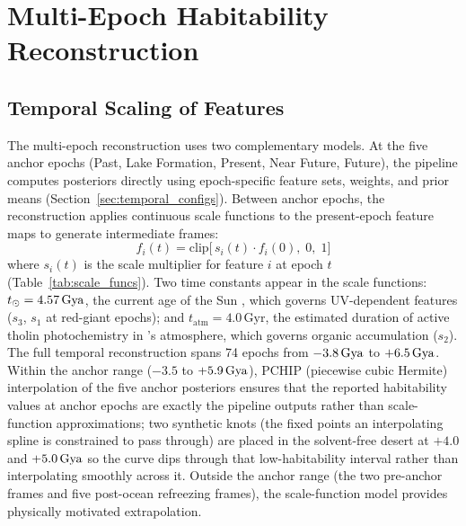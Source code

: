 \section{Multi-Epoch Habitability Reconstruction}
\label{sec:multi_epoch}

\subsection{Temporal Scaling of Features}
\label{sec:epoch_scaling}

The multi-epoch reconstruction uses two complementary models.  At the five anchor epochs (Past, Lake Formation, Present, Near Future, Future), the pipeline computes posteriors directly using epoch-specific feature sets, weights, and prior means (Section~\ref{sec:temporal_configs}).  Between anchor epochs, the reconstruction applies continuous scale functions to the present-epoch feature maps to generate intermediate frames:
\begin{equation}
  f_i(t) = \text{clip}\bigl[\,s_i(t)\cdot f_i(0),\;0,\;1\bigr]
  \label{eq:temporal_scale}
\end{equation}
where $s_i(t)$ is the scale multiplier for feature $i$ at epoch $t$ (Table~\ref{tab:scale_funcs}).  Two time constants appear in the scale functions: $t_\odot = 4.57\,\text{Gya}$, the current age of the Sun \citep{Bahcall2001}, which governs UV-dependent features ($s_3$, $s_1$ at red-giant epochs); and $t_\text{atm} = 4.0\,\text{Gyr}$, the estimated duration of active tholin photochemistry in \titan{}'s atmosphere, which governs organic accumulation ($s_2$).  The full temporal reconstruction spans 74 epochs from $-3.8\,\text{Gya}$ to $+6.5\,\text{Gya}$.  Within the anchor range ($-3.5$ to $+5.9\,\text{Gya}$), PCHIP (piecewise cubic Hermite) interpolation of the five anchor posteriors ensures that the reported habitability values at anchor epochs are exactly the pipeline outputs rather than scale-function approximations; two synthetic knots (the fixed points an interpolating spline is constrained to pass through) are placed in the solvent-free desert at $+4.0$ and $+5.0\,\text{Gya}$ so the curve dips through that low-habitability interval rather than interpolating smoothly across it.  Outside the anchor range (the two pre-anchor frames and five post-ocean refreezing frames), the scale-function model provides physically motivated extrapolation.

